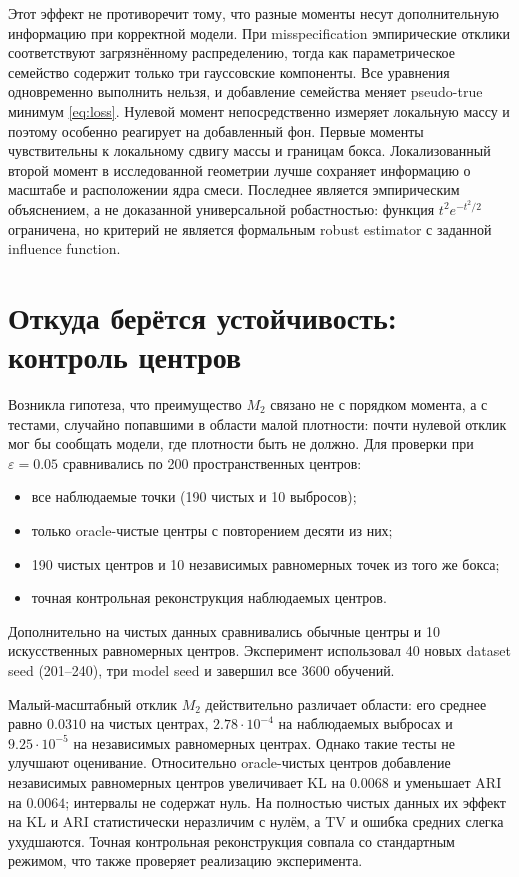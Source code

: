 \documentclass[11pt,a4paper]{article}
\newcommand{\Mtwo}{M_2}
\begin{document}
Этот эффект не противоречит тому, что разные моменты несут дополнительную
информацию при корректной модели. При misspecification эмпирические отклики
соответствуют загрязнённому распределению, тогда как параметрическое семейство
содержит только три гауссовские компоненты. Все уравнения одновременно
выполнить нельзя, и добавление семейства меняет pseudo-true минимум
\eqref{eq:loss}. Нулевой момент непосредственно измеряет локальную массу и
поэтому особенно реагирует на добавленный фон. Первые моменты чувствительны к
локальному сдвигу массы и границам бокса. Локализованный второй момент в
исследованной геометрии лучше сохраняет информацию о масштабе и расположении
ядра смеси. Последнее является эмпирическим объяснением, а не доказанной
универсальной робастностью: функция $t^2e^{-t^2/2}$ ограничена, но критерий не
является формальным robust estimator с заданной influence function.

\section{Откуда берётся устойчивость: контроль центров}

Возникла гипотеза, что преимущество $\Mtwo$ связано не с порядком момента, а
с тестами, случайно попавшими в области малой плотности: почти нулевой отклик
мог бы сообщать модели, где плотности быть не должно. Для проверки при
$\varepsilon=0.05$ сравнивались по 200 пространственных центров:
\begin{itemize}
  \item все наблюдаемые точки (190 чистых и 10 выбросов);
  \item только oracle-чистые центры с повторением десяти из них;
  \item 190 чистых центров и 10 независимых равномерных точек из того же бокса;
  \item точная контрольная реконструкция наблюдаемых центров.
\end{itemize}
Дополнительно на чистых данных сравнивались обычные центры и 10 искусственных
равномерных центров. Эксперимент использовал 40 новых dataset seed (201--240),
три model seed и завершил все 3600 обучений.

Малый-масштабный отклик $\Mtwo$ действительно различает области: его среднее
равно $0.0310$ на чистых центрах, $2.78\cdot10^{-4}$ на наблюдаемых выбросах
и $9.25\cdot10^{-5}$ на независимых равномерных центрах. Однако такие тесты
не улучшают оценивание. Относительно oracle-чистых центров добавление
независимых равномерных центров увеличивает KL на $0.0068$ и уменьшает ARI на
$0.0064$; интервалы не содержат нуль. На полностью чистых данных их эффект на
KL и ARI статистически неразличим с нулём, а TV и ошибка средних слегка
ухудшаются. Точная контрольная реконструкция совпала со стандартным режимом,
что также проверяет реализацию эксперимента.
\end{document}
